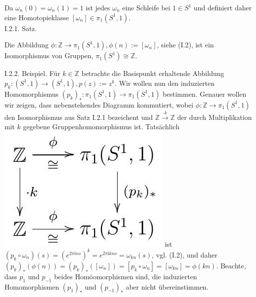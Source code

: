 \documentclass[10pt, letterpaper]{article}
\begin{document}
Da $\omega_{n}(0)=\omega_{n}(1)=1$ ist jedes $\omega_{n}$ eine Schleife bei $1 \in S^{1}$ und definiert daher eine Homotopieklasse $\left[\omega_{n}\right] \in \pi_{1}\left(S^{1}, 1\right)$.\\




I.2.1. Satz. 

Die Abbildung $\phi: \mathbb{Z} \rightarrow \pi_{1}\left(S^{1}, 1\right), \phi(n):=\left[\omega_{n}\right]$, siehe (I.2), ist ein Isomorphismus von Gruppen, $\pi_{1}\left(S^{1}\right) \cong \mathbb{Z}$.


I.2.2. Beispiel. Für $k \in \mathbb{Z}$ betrachte die Basispunkt erhaltende Abbildung $p_{k}:\left(S^{1}, 1\right) \rightarrow\left(S^{1}, 1\right), p(z):=z^{k}$. Wir wollen nun den induzierten Homomorphismus $\left(p_{k}\right)_{*}: \pi_{1}\left(S^{1}, 1\right) \rightarrow \pi_{1}\left(S^{1}, 1\right)$ bestimmen. Genauer wollen wir zeigen, dass nebenstehendes Diagramm kommutiert, wobei $\phi: \mathbb{Z} \rightarrow \pi_{1}\left(S^{1}, 1\right)$ den Isomorphismus aus Satz I.2.1 bezeichent und $\mathbb{Z} \xrightarrow{\cdot k} \mathbb{Z}$ der durch Multiplikation mit $k$ gegebene Gruppenhomomorphismus ist. Tatsächlich\\
\includegraphics[max width=\textwidth]{2025_06_05_d7ed2bacd1e9ce1db1f0g-014} ist $\left(p_{k} \circ \omega_{n}\right)(s)=\left(e^{2 \pi \mathrm{i} n s}\right)^{k}=e^{2 \pi \mathrm{i} k n s}=\omega_{k n}(s)$, vgl. (I.2), und daher $\left(p_{k}\right)_{*}(\phi(n))=\left(p_{k}\right)_{*}\left(\left[\omega_{n}\right]\right)=\left[p_{k} \circ \omega_{n}\right]=\left[\omega_{k n}\right]=\phi(k n)$. Beachte, dass $p_{1}$ und $p_{-1}$ beides Homöomorphismen sind, die induzierten Homomorphismen $\left(p_{1}\right)_{*}$ und $\left(p_{-1}\right)_{*}$ aber nicht übereinstimmen.
\end{document}
